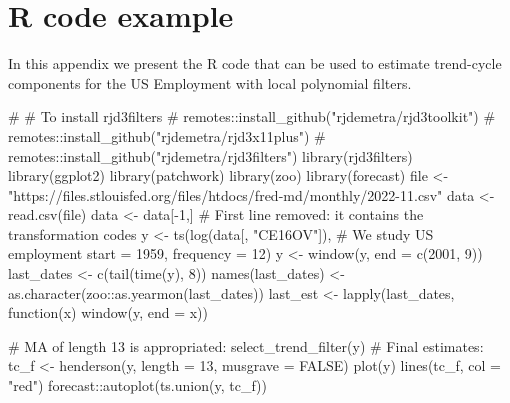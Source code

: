 \documentclass[
]{article}
\newenvironment{Shaded}{\begin{snugshade}}{\end{snugshade}}
\newcommand{\AttributeTok}[1]{\textcolor[rgb]{0.40,0.45,0.13}{#1}}
\newcommand{\CommentTok}[1]{\textcolor[rgb]{0.37,0.37,0.37}{#1}}
\newcommand{\ConstantTok}[1]{\textcolor[rgb]{0.56,0.35,0.01}{#1}}
\newcommand{\ControlFlowTok}[1]{\textcolor[rgb]{0.00,0.23,0.31}{#1}}
\newcommand{\DecValTok}[1]{\textcolor[rgb]{0.68,0.00,0.00}{#1}}
\newcommand{\FunctionTok}[1]{\textcolor[rgb]{0.28,0.35,0.67}{#1}}
\newcommand{\NormalTok}[1]{\textcolor[rgb]{0.00,0.23,0.31}{#1}}
\newcommand{\OtherTok}[1]{\textcolor[rgb]{0.00,0.23,0.31}{#1}}
\newcommand{\SpecialCharTok}[1]{\textcolor[rgb]{0.37,0.37,0.37}{#1}}
\newcommand{\StringTok}[1]{\textcolor[rgb]{0.13,0.47,0.30}{#1}}
\newcommand\1{\mathds{1}}
\begin{document}
\section{R code example}\label{ann-ex-r}

In this appendix we present the R code that can be used to estimate
trend-cycle components for the US Employment with local polynomial
filters.

\begin{Shaded}
\begin{Highlighting}[]
\CommentTok{\# \# To install rjd3filters}
\CommentTok{\# remotes::install\_github("rjdemetra/rjd3toolkit")}
\CommentTok{\# remotes::install\_github("rjdemetra/rjd3x11plus")}
\CommentTok{\# remotes::install\_github("rjdemetra/rjd3filters")}
\FunctionTok{library}\NormalTok{(rjd3filters)}
\FunctionTok{library}\NormalTok{(ggplot2)}
\FunctionTok{library}\NormalTok{(patchwork)}
\FunctionTok{library}\NormalTok{(zoo)}
\FunctionTok{library}\NormalTok{(forecast)}
\NormalTok{file }\OtherTok{\textless{}{-}}\StringTok{"https://files.stlouisfed.org/files/htdocs/fred{-}md/monthly/2022{-}11.csv"}
\NormalTok{data }\OtherTok{\textless{}{-}} \FunctionTok{read.csv}\NormalTok{(file)}
\NormalTok{data }\OtherTok{\textless{}{-}}\NormalTok{ data[}\SpecialCharTok{{-}}\DecValTok{1}\NormalTok{,] }\CommentTok{\# First line removed: it contains the transformation codes}
\NormalTok{y }\OtherTok{\textless{}{-}} \FunctionTok{ts}\NormalTok{(}\FunctionTok{log}\NormalTok{(data[, }\StringTok{"CE16OV"}\NormalTok{]), }\CommentTok{\# We study US employment}
         \AttributeTok{start =} \DecValTok{1959}\NormalTok{, }\AttributeTok{frequency =} \DecValTok{12}\NormalTok{)}
\NormalTok{y }\OtherTok{\textless{}{-}} \FunctionTok{window}\NormalTok{(y, }\AttributeTok{end =} \FunctionTok{c}\NormalTok{(}\DecValTok{2001}\NormalTok{, }\DecValTok{9}\NormalTok{))}
\NormalTok{last\_dates }\OtherTok{\textless{}{-}} \FunctionTok{c}\NormalTok{(}\FunctionTok{tail}\NormalTok{(}\FunctionTok{time}\NormalTok{(y), }\DecValTok{8}\NormalTok{))}
\FunctionTok{names}\NormalTok{(last\_dates) }\OtherTok{\textless{}{-}} \FunctionTok{as.character}\NormalTok{(zoo}\SpecialCharTok{::}\FunctionTok{as.yearmon}\NormalTok{(last\_dates))}
\NormalTok{last\_est }\OtherTok{\textless{}{-}} \FunctionTok{lapply}\NormalTok{(last\_dates, }\ControlFlowTok{function}\NormalTok{(x) }\FunctionTok{window}\NormalTok{(y, }\AttributeTok{end =}\NormalTok{ x))}

\CommentTok{\# MA of length 13 is appropriated:}
\FunctionTok{select\_trend\_filter}\NormalTok{(y)}
\CommentTok{\# Final estimates:}
\NormalTok{tc\_f }\OtherTok{\textless{}{-}} \FunctionTok{henderson}\NormalTok{(y, }\AttributeTok{length =} \DecValTok{13}\NormalTok{, }\AttributeTok{musgrave =} \ConstantTok{FALSE}\NormalTok{)}
\FunctionTok{plot}\NormalTok{(y)}
\FunctionTok{lines}\NormalTok{(tc\_f, }\AttributeTok{col =} \StringTok{"red"}\NormalTok{)}
\NormalTok{forecast}\SpecialCharTok{::}\FunctionTok{autoplot}\NormalTok{(}\FunctionTok{ts.union}\NormalTok{(y, tc\_f))}


\end{Highlighting}
\end{Shaded}
\end{document}
